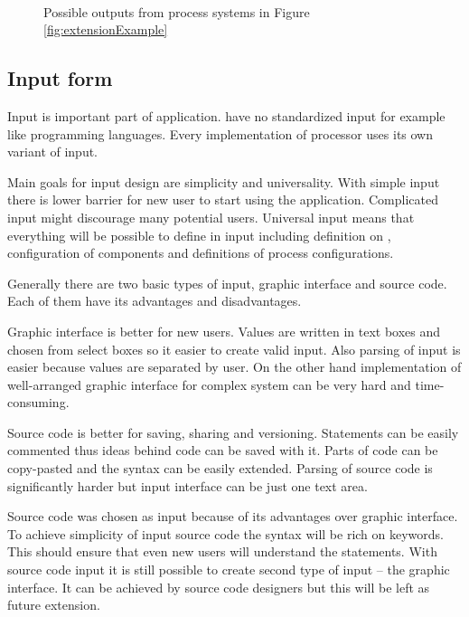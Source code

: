 \begin{figure}[h]
	\centering
	 ~
	\caption{Possible outputs from process systems in Figure \ref{fig:extensionExample}}
	\label{fig:extensionExampleResult}
\end{figure}


\subsection{Input form}

Input is important part of application.
\lsystems have no standardized input for example like programming languages.
Every implementation of \lsystem processor uses its own variant of input.

Main goals for input design are simplicity and universality.
With simple input there is lower barrier for new user to start using the application.
Complicated input might discourage many potential users.
Universal input means that everything will be possible to define in input including definition on \lsystems, configuration of components and definitions of process configurations.

Generally there are two basic types of input, graphic interface and source code.
Each of them have its advantages and disadvantages.

Graphic interface is better for new users.
Values are written in text boxes and chosen from select boxes so it easier to create valid input.
Also parsing of input is easier because values are separated by user.
On the other hand implementation of well-arranged graphic interface for complex system can be very hard and time-consuming.

Source code is better for saving, sharing and versioning.
Statements can be easily commented thus ideas behind code can be saved with it.
Parts of code can be copy-pasted and the syntax can be easily extended.
Parsing of source code is significantly harder but input interface can be just one text area.

Source code was chosen as input because of its advantages over graphic interface.
To achieve simplicity of input source code the syntax will be rich on keywords.
This should ensure that even new users will understand the statements.
With source code input it is still possible to create second type of input -- the graphic interface.
It can be achieved by source code designers but this will be left as future extension.


